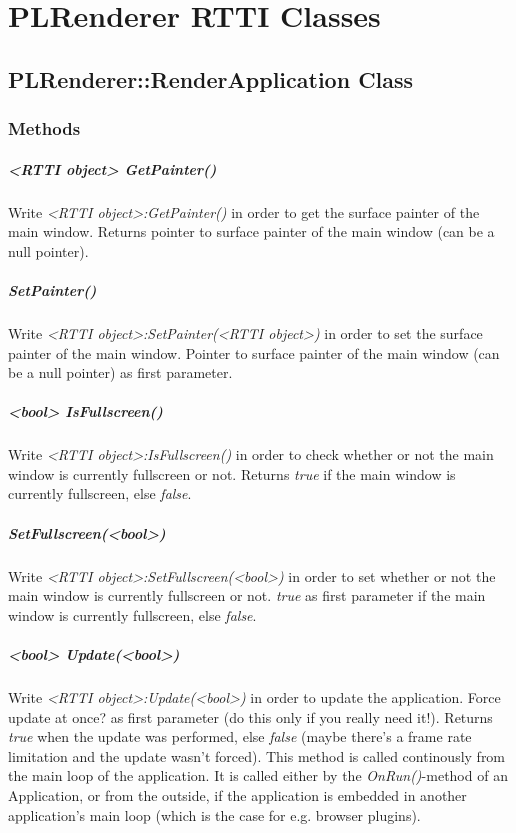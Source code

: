 \chapter{PLRenderer RTTI Classes}




\section{PLRenderer::RenderApplication Class}


\subsection{Methods}

\paragraph{<RTTI object> GetPainter()}
Write \emph{<RTTI object>:GetPainter()} in order to get the surface painter of the main window. Returns pointer to surface painter of the main window (can be a null pointer).

\paragraph{SetPainter()}
Write \emph{<RTTI object>:SetPainter(<RTTI object>)} in order to set the surface painter of the main window. Pointer to surface painter of the main window (can be a null pointer) as first parameter.

\paragraph{<bool> IsFullscreen()}
Write \emph{<RTTI object>:IsFullscreen()} in order to check whether or not the main window is currently fullscreen or not. Returns \emph{true} if the main window is currently fullscreen, else \emph{false}.

\paragraph{SetFullscreen(<bool>)}
Write \emph{<RTTI object>:SetFullscreen(<bool>)} in order to set whether or not the main window is currently fullscreen or not. \emph{true} as first parameter if the main window is currently fullscreen, else \emph{false}.

\paragraph{<bool> Update(<bool>)}
Write \emph{<RTTI object>:Update(<bool>)} in order to update the application. Force update at once? as first parameter (do this only if you really need it!). Returns \emph{true} when the update was performed, else \emph{false} (maybe there's a frame rate limitation and the update wasn't forced). This method is called continously from the main loop of the application. It is called either by the \emph{OnRun()}-method of an Application, or from the outside, if the application is embedded in another application's main loop (which is the case for e.g. browser plugins).
